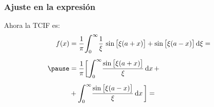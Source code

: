 \documentclass[12pt]{beamer}
\begin{document}
\begin{frame}
\frametitle{Ajuste en la expresión}
Ahora la TCIF es:
\pause
\begin{eqnarray*}
\begin{aligned}
f (x) &= \dfrac{1}{\pi} \scaleint{6ex}_{\bs 0}^{\infty} \dfrac{1}{\xi} \, \sin \big[ \xi (a + x) \big] + \sin \big[ \xi (a - x) \big] \dd{\xi} = \\[0.5em] \pause
&= \dfrac{1}{\pi} \bigg[ \scaleint{6ex}_{\bs 0}^{\infty} \dfrac{\sin \big[ \xi (a + x) \big]}{\xi} \dd{x} + \\[0.5em] 
&+ \scaleint{6ex}_{\bs 0}^{\infty} \dfrac{\sin \big[ \xi (a - x) \big]}{\xi} \dd{x} \bigg] =
\end{aligned}
\end{eqnarray*}
\end{frame}
\end{document}
